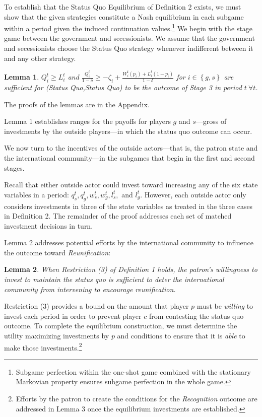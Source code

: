 \documentclass[11pt,letterpaper, notitlepage]{article}
\newtheorem{lemma}{Lemma}
\begin{document}
To establish that the Status Quo Equilibrium of Definition 2 exists, we must show that the given strategies constitute a Nash equilibrium in each subgame within a period given the induced continuation values.\footnote{Subgame perfection within the one-shot game combined with the stationary Markovian property ensures subgame perfection in the whole game.} We begin with the stage game between the government and secessionists. We assume that the government and secessionists choose the Status Quo strategy whenever indifferent between it and any other strategy.

\begin{lemma}
$Q_i^t \geq L_i^t$ and $\frac {Q_i^t}{1-\delta} \geq  -\zeta_i+\frac{W_i^t(p_i) + L_i^t(1-p_i)}{1-\delta}$ for $i \in \left\{g,s\right\}$ are sufficient for (Status Quo,Status Quo) to be the outcome of Stage 3 in period $t \ \forall t$. 
\end{lemma}

The proofs of the lemmas are in the Appendix.

Lemma 1 establishes ranges for the payoffs for players $g$ and $s$---gross of investments by the outside players---in which the status quo outcome can occur.

We now turn to the incentives of the outside actors---that is, the patron state and the international community---in the subgames that begin in the first and second stages.

Recall that either outside actor could invest toward increasing any of the six state variables in a period: $q_s^t,q_g^t,w_s^t,w_g^t,l_s^t,$ and $l_g^t$. However, each outside actor only considers investments in three of the state variables as treated in the three cases in Definition 2. The remainder of the proof addresses each set of matched investment decisions in turn.

Lemma 2 addresses potential efforts by the international community to influence the outcome toward \emph{Reunification}:

\begin{lemma}
When Restriction (3) of Definition 1 holds, the patron's willingness to invest to maintain the status quo is sufficient to deter the international community from intervening to encourage reunification.
\end{lemma}

\noindent Restriction (3) provides a bound on the amount that player $p$ must be \emph{willing} to invest each period in order to prevent player $c$ from contesting the status quo outcome. To complete the equilibrium construction, we must determine the utility maximizing investments by $p$ and conditions to ensure that it is \emph{able} to make those investments.\footnote{Efforts by the patron to create the conditions for the \emph{Recognition} outcome are addressed in Lemma 3 once the equilibrium investments are established.}
\end{document}
